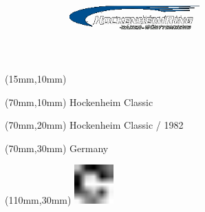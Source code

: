 \null\newpage
\begin{textblock*}{50mm}(15mm,10mm)%
\includegraphics[width=50mm]{LG/HOC.png}
\end{textblock*}
\begin{textblock*}{130mm}(70mm,10mm)%
{\fontsize{20}{20}\selectfont Hockenheim Classic}\\
\end{textblock*}
\begin{textblock*}{120mm}(70mm,20mm)%
{\fontsize{16}{16}\selectfont Hockenheim Classic / 1982}\\
\end{textblock*}
\begin{textblock*}{120mm}(70mm,30mm)%
{\fontsize{12}{12}\selectfont Germany}
\end{textblock*}
\begin{textblock*}{30mm}(110mm,30mm)%
\centering
\includegraphics[height=15mm]{icons/fa-rotate-right.pdf}
\end{textblock*}

